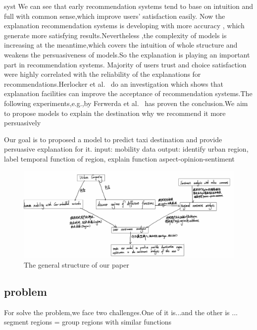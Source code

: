 \documentclass[runningheads]{llncs}
\begin{document}

syst
We can see that early recommendation systems tend to base on intuition and full with common sense,which improve users' satisfaction easily. Now the explanation recommendation systems is developing with more accuracy , which generate more satisfying results.Nevertheless ,the complexity of models is increasing at the meantime,which covers the intuition of whole structure and weakens the persuasiveness of models.So the explanation is playing an important part in recommendation systems.%
Majority of users trust and choice satisfaction were highly correlated with the reliability of the explanations for recommendations.Herlocker et al.~\cite{Herlocker2000Explanation}  do an investigation which shows that explanation facilities can improve the acceptance of recommendation systems.The following experiments,e.g.,by Ferwerda et al.~\cite{Ferwerda2012ContentCorrelate} has proven the conclusion.We aim to propose models to explain the destination why we recommend it more persuasively


Our goal is to proposed a model to predict taxi destination and provide persuasive explanation for it.
input: mobility data
output: identify urban region, label temporal function of region, explain function aspect-opinion-sentiment

\begin{figure}
    \centering
    \includegraphics[scale=0.25]{Structure.png}
    \caption{The general structure of our paper}
\end{figure}

\subsection{problem}
For solve the problem,we face two challenges.One of it is...and the other is ...
segment regions = group regions with similar functions
\end{document}
